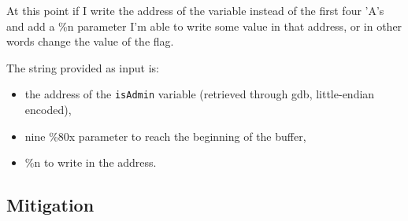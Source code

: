 \documentclass[a4paper,12pt]{article}
\begin{document}
At this point if I write the address of the variable instead of the first four 'A's and add a \%n parameter I'm able to write some value in that address, or in other words change the value of the flag.

The string provided as input is:
\begin{itemize}
\item the address of the \texttt{isAdmin} variable (retrieved through gdb, little-endian encoded),
\item nine \%80x parameter to reach the beginning of the buffer,
\item \%n to write in the address.
\end{itemize}



\subsection{Mitigation}
\end{document}
